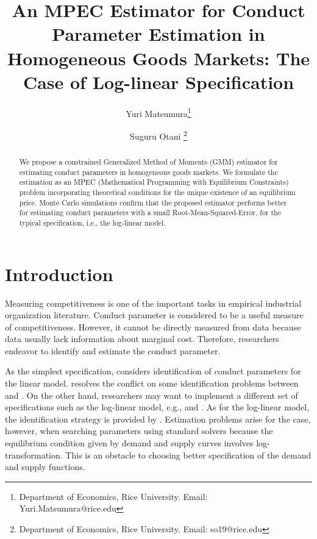 \documentclass[11pt, a4paper]{article}
\title{An MPEC Estimator for Conduct Parameter Estimation in Homogeneous Goods Markets: The Case of Log-linear Specification}
\author{Yuri Matsumura\thanks{Department of Economics, Rice University. Email: Yuri.Matsumura@rice.edu} \and Suguru Otani \thanks{Department of Economics, Rice University. Email: so19@rice.edu
}}
\begin{document}
\maketitle
\begin{abstract}
    We propose a constrained Generalized Method of Moments (GMM) estimator for estimating conduct parameters in homogeneous goods markets. We formulate the estimation as an MPEC (Mathematical Programming with Equilibrium Constraints) problem incorporating theoretical conditions for the unique existence of an equilibrium price. 
    Monte Carlo simulations confirm that the proposed estimator performs better for estimating conduct parameters with a small Root-Mean-Squared-Error, for the typical specification, i.e., the log-linear model.
\end{abstract}


\section{Introduction}
Measuring competitiveness is one of the important tasks in empirical industrial organization literature.
Conduct parameter is considered to be a useful measure of competitiveness. 
However, it cannot be directly measured from data because data usually lack information about marginal cost.
Therefore, researchers endeavor to identify and estimate the conduct parameter.

As the simplest specification, \citet{bresnahan1982oligopoly} considers identification of conduct parameters for the linear model. \cite{matsumura2023resolving} resolves the conflict on some identification problems between \cite{bresnahan1982oligopoly} and \cite{perloff2012collinearity}. 
On the other hand, researchers may want to implement a different set of specifications such as the log-linear model, e.g., \cite{okazaki2022excess} and \cite{merel2009measuring}. As for the log-linear model, the identification strategy is provided by \citet{lau1982identifying}. 
Estimation problems arise for the case, however, when searching parameters using standard solvers because the equilibrium condition given by demand and supply curves involves log-transformation. 
This is an obstacle to choosing better specification of the demand and supply functions.
\end{document}
